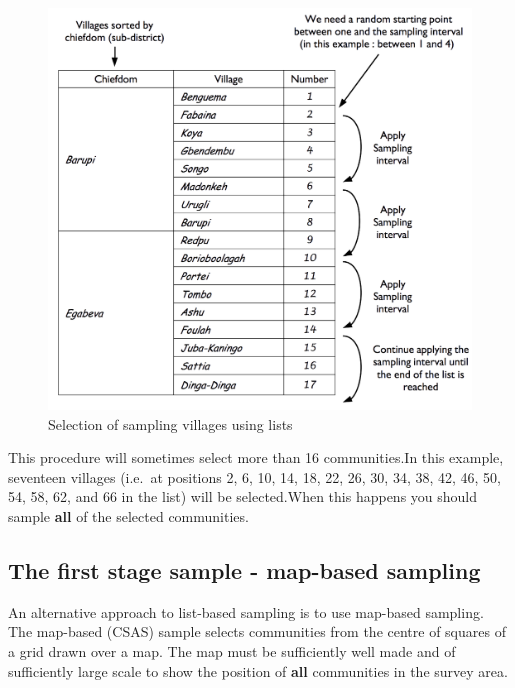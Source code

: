 \documentclass[12pt,a4paper]{book}
\theoremstyle{definition}
\theoremstyle{definition}
\theoremstyle{definition}
\theoremstyle{remark}
\begin{document}
\begin{figure}[H]

{\centering \includegraphics{figures/listSample2} 

}

\caption{Selection of sampling villages using lists}\label{fig:sample4}
\end{figure}

This procedure will sometimes select more than 16 communities.In this
example, seventeen villages (i.e.~at positions 2, 6, 10, 14, 18, 22, 26,
30, 34, 38, 42, 46, 50, 54, 58, 62, and 66 in the list) will be
selected.When this happens you should sample \textbf{all} of the
selected communities.

\hypertarget{the-first-stage-sample---map-based-sampling}{%
\subsection{The first stage sample - map-based
sampling}\label{the-first-stage-sample---map-based-sampling}}

An alternative approach to list-based sampling is to use map-based
sampling. The map-based (CSAS) sample selects communities from the
centre of squares of a grid drawn over a map. The map must be
sufficiently well made and of sufficiently large scale to show the
position of \textbf{all} communities in the survey area.
\end{document}
